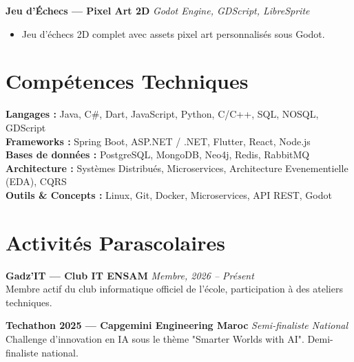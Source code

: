 \documentclass[a4paper,11pt]{article}
\begin{document}
\vspace{4pt}

\textbf{Jeu d'Échecs — Pixel Art 2D} \hfill \textit{Godot Engine, GDScript, LibreSprite}
\begin{itemize}[leftmargin=*, nosep, topsep=2pt]
  \item Jeu d'échecs 2D complet avec assets pixel art personnalisés sous Godot.
\end{itemize}

\section{Compétences Techniques}
\textbf{Langages :} Java, C\#, Dart, JavaScript, Python, C/C++, SQL, NOSQL, GDScript \\
\textbf{Frameworks :} Spring Boot, ASP.NET / .NET, Flutter, React, Node.js \\
\textbf{Bases de données :} PostgreSQL, MongoDB, Neo4j, Redis, RabbitMQ \\
\textbf{Architecture :} Systèmes Distribués, Microservices, Architecture Evenementielle (EDA), CQRS \\
\textbf{Outils \& Concepts :} Linux, Git, Docker, Microservices, API REST, Godot




\section{Activités Parascolaires}

\textbf{Gadz'IT — Club IT ENSAM} \hfill \textit{Membre, 2026 -- Présent} \\
Membre actif du club informatique officiel de l'école, participation à des ateliers techniques.

\vspace{2pt}

\textbf{Techathon 2025 — Capgemini Engineering Maroc} \hfill \textit{Semi-finaliste National} \\
Challenge d'innovation en IA sous le thème "Smarter Worlds with AI". Demi-finaliste national.



\end{document}
